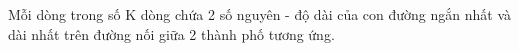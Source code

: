 Mỗi dòng trong số K dòng chứa 2 số nguyên - độ dài của con đường ngắn nhất và dài nhất trên đường nối giữa 2 thành phố tương ứng.